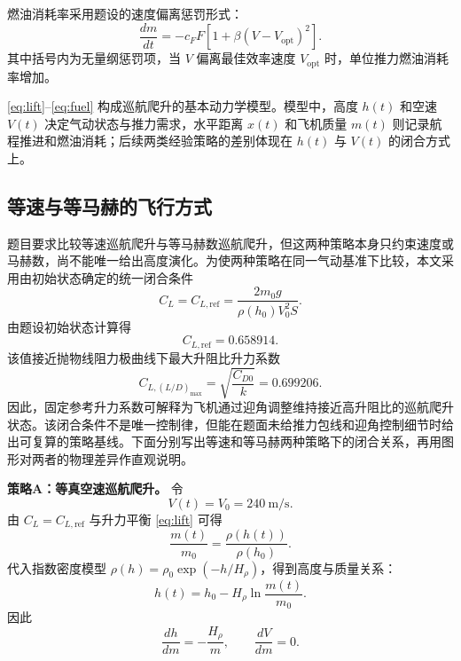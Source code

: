 \documentclass[withoutpreface,bwprint]{cumcmthesis}
\begin{document}
燃油消耗率采用题设的速度偏离惩罚形式：
\begin{equation}
\frac{dm}{dt}=-c_F F\left[1+\beta(V-V_{\mathrm{opt}})^2\right].
\label{eq:fuel}
\end{equation}
其中括号内为无量纲惩罚项，当 $V$ 偏离最佳效率速度 $V_{\mathrm{opt}}$ 时，单位推力燃油消耗率增加。

\eqref{eq:lift}--\eqref{eq:fuel} 构成巡航爬升的基本动力学模型。模型中，高度 $h(t)$ 和空速 $V(t)$ 决定气动状态与推力需求，水平距离 $x(t)$ 和飞机质量 $m(t)$ 则记录航程推进和燃油消耗；后续两类经验策略的差别体现在 $h(t)$ 与 $V(t)$ 的闭合方式上。

\subsection{等速与等马赫的飞行方式}

题目要求比较等速巡航爬升与等马赫数巡航爬升，但这两种策略本身只约束速度或马赫数，尚不能唯一给出高度演化。为使两种策略在同一气动基准下比较，本文采用由初始状态确定的统一闭合条件
\begin{equation}
C_L=C_{L,\mathrm{ref}}=\frac{2m_0g}{\rho(h_0)V_0^2S}.
\label{eq:CL_ref}
\end{equation}
由题设初始状态计算得
\begin{equation}
C_{L,\mathrm{ref}}=0.658914.
\label{eq:CL_ref_val}
\end{equation}
该值接近抛物线阻力极曲线下最大升阻比升力系数
\begin{equation}
C_{L,(L/D)_{\max}}=\sqrt{\frac{C_{D0}}{k}}=0.699206.
\label{eq:CL_maxLD}
\end{equation}
因此，固定参考升力系数可解释为飞机通过迎角调整维持接近高升阻比的巡航爬升状态。该闭合条件不是唯一控制律，但能在题面未给推力包线和迎角控制细节时给出可复算的策略基线。下面分别写出等速和等马赫两种策略下的闭合关系，再用图形对两者的物理差异作直观说明。

\textbf{策略A：等真空速巡航爬升。} 令
\begin{equation}
V(t)=V_0=240\ \mathrm{m/s}.
\label{eq:const_V}
\end{equation}
由 $C_L=C_{L,\mathrm{ref}}$ 与升力平衡 \eqref{eq:lift} 可得
\begin{equation}
\frac{m(t)}{m_0}=\frac{\rho(h(t))}{\rho(h_0)}.
\label{eq:m_rho_ratio}
\end{equation}
代入指数密度模型 $\rho(h)=\rho_0\exp(-h/H_\rho)$，得到高度与质量关系：
\begin{equation}
h(t)=h_0-H_\rho \ln\frac{m(t)}{m_0}.
\label{eq:h_vs_m_constV}
\end{equation}
因此
\begin{equation}
\frac{dh}{dm}=-\frac{H_\rho}{m},\qquad \frac{dV}{dm}=0.
\label{eq:deriv_constV}
\end{equation}
\end{document}
